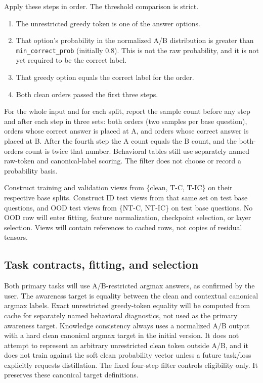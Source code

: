 \documentclass[11pt]{article}
\begin{document}
Apply these steps in order. The threshold comparison is strict.
\begin{enumerate}
\item The unrestricted greedy token is one of the answer options.
\item That option's probability in the normalized A/B distribution is greater than \texttt{min\_correct\_prob} (initially 0.8). This is not the raw probability, and it is not yet required to be the correct label.
\item That greedy option equals the correct label for the order.
\item Both clean orders passed the first three steps.
\end{enumerate}
For the whole input and for each split, report the sample count before any step and after each step in three sets: both orders (two samples per base question), orders whose correct answer is placed at A, and orders whose correct answer is placed at B.
After the fourth step the A count equals the B count, and the both-orders count is twice that number.
Behavioral tables still use separately named raw-token and canonical-label scoring.
The filter does not choose or record a probability basis.

Construct training and validation views from \{clean, T-C, T-IC\} on their respective base splits.
Construct ID test views from that same set on test base questions, and OOD test views from \{NT-C, NT-IC\} on test base questions.
No OOD row will enter fitting, feature normalization, checkpoint selection, or layer selection.
Views will contain references to cached rows, not copies of residual tensors.

\subsection{Task contracts, fitting, and selection}

Both primary tasks will use A/B-restricted argmax answers, as confirmed by the user.
The awareness target is equality between the clean and contextual canonical argmax labels.
Exact unrestricted greedy-token equality will be computed from cache for separately named behavioral diagnostics, not used as the primary awareness target.
Knowledge consistency always uses a normalized A/B output with a hard clean canonical argmax target in the initial version.
It does not attempt to represent an arbitrary unrestricted clean token outside A/B, and it does not train against the soft clean probability vector unless a future task/loss explicitly requests distillation.
The fixed four-step filter controls eligibility only. It preserves these canonical target definitions.
\end{document}
